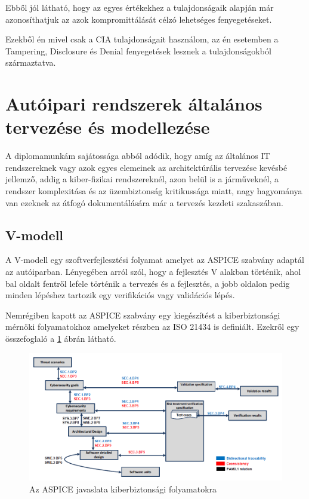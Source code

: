 Ebből jól látható, hogy az egyes értékekhez a tulajdonságaik alapján már azonosíthatjuk az azok kompromittálását célzó lehetséges fenyegetéseket.

Ezekből én mivel csak a CIA tulajdonságait használom, az én esetemben a Tampering, Disclosure és Denial fenyegetések lesznek a tulajdonságokból származtatva.

\section{Autóipari rendszerek általános tervezése és modellezése}

A diplomamunkám sajátossága abból adódik, hogy amíg az általános IT rendszereknek vagy azok egyes elemeinek az architektúrális tervezése kevésbé jellemző, addig a kiber-fizikai rendszereknél, azon belül is a járműveknél, a rendszer komplexitása és az üzembiztonság kritikussága miatt, nagy hagyománya van ezeknek az átfogó dokumentálására már a tervezés kezdeti szakaszában.

\subsection{V-modell}

A V-modell egy szoftverfejlesztési folyamat amelyet az ASPICE szabvány adaptál az autóiparban. Lényegében arról szól, hogy a fejlesztés V alakban történik, ahol bal oldalt fentről lefele történik a tervezés és a fejlesztés, a jobb oldalon pedig minden lépéshez tartozik egy verifikációs vagy validációs lépés.

Nemrégiben kapott az ASPICE\cite{ASPICE} szabvány egy kiegészítést a kiberbiztonsági mérnöki folyamatokhoz amelyeket részben az ISO 21434 is definiált. Ezekről egy összefoglaló a \ref{fig:ASPICE} ábrán látható.

\begin{figure}[!ht]
\centering
\includegraphics[width=150mm, keepaspectratio]{figures/02_ASPICE.png}
\caption{Az ASPICE javaslata kiberbiztonsági folyamatokra\cite{ASPICE}}
\label{fig:ASPICE}
\end{figure}

